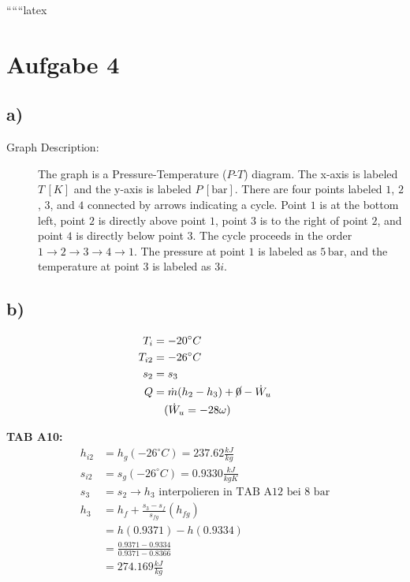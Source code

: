 
``````latex


\section*{Aufgabe 4}

\subsection*{a)}

\begin{description}
    \item[Graph Description:] The graph is a Pressure-Temperature ($P$-$T$) diagram. The x-axis is labeled $T \, [K]$ and the y-axis is labeled $P \, [\text{bar}]$. There are four points labeled $1$, $2$, $3$, and $4$ connected by arrows indicating a cycle. Point $1$ is at the bottom left, point $2$ is directly above point $1$, point $3$ is to the right of point $2$, and point $4$ is directly below point $3$. The cycle proceeds in the order $1 \rightarrow 2 \rightarrow 3 \rightarrow 4 \rightarrow 1$. The pressure at point $1$ is labeled as $5 \, \text{bar}$, and the temperature at point $3$ is labeled as $3i$.
\end{description}

\subsection*{b)}

\begin{align*}
    T_i &= -20^\circ C \\
    T_{i2} &= -26^\circ C \\
    s_2 &= s_3 \\
    Q &= \dot{m} (h_2 - h_3) + \cancel{0} - \dot{W}_u \\
    & \quad (\dot{W}_u = -28 \omega)
\end{align*}

\textbf{TAB A10:}
\begin{align*}
    h_{i2} &= h_g (-26^\circ C) = 237.62 \frac{kJ}{kg} \\
    s_{i2} &= s_g (-26^\circ C) = 0.9330 \frac{kJ}{kgK} \\
    s_3 &= s_2 \rightarrow h_3 \text{ interpolieren in TAB A12 bei } 8 \text{ bar} \\
    h_3 &= h_{f} + \frac{s_3 - s_{f}}{s_{fg}} (h_{fg}) \\
    &= h(0.9371) - h(0.9334) \\
    &= \frac{0.9371 - 0.9334}{0.9371 - 0.8366} \\
    &= 274.169 \frac{kJ}{kg}
\end{align*}

